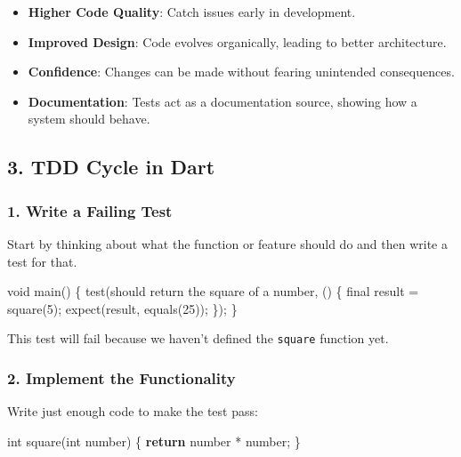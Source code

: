 \documentclass[
]{article}
\newenvironment{Shaded}{\begin{snugshade}}{\end{snugshade}}
\newcommand{\AttributeTok}[1]{\textcolor[rgb]{0.16,0.50,0.73}{#1}}
\newcommand{\DataTypeTok}[1]{\textcolor[rgb]{0.16,0.50,0.73}{#1}}
\newcommand{\DecValTok}[1]{\textcolor[rgb]{0.96,0.45,0.00}{#1}}
\newcommand{\KeywordTok}[1]{\textcolor[rgb]{0.81,0.81,0.76}{\textbf{#1}}}
\newcommand{\NormalTok}[1]{\textcolor[rgb]{0.81,0.81,0.76}{#1}}
\newcommand{\OperatorTok}[1]{\textcolor[rgb]{0.81,0.81,0.76}{#1}}
\newcommand{\StringTok}[1]{\textcolor[rgb]{0.96,0.31,0.31}{#1}}
\providecommand{\tightlist}{%
  \setlength{\itemsep}{0pt}\setlength{\parskip}{0pt}}
\begin{document}
\begin{itemize}
\tightlist
\item
  \textbf{Higher Code Quality}: Catch issues early in development.
\item
  \textbf{Improved Design}: Code evolves organically, leading to better
  architecture.
\item
  \textbf{Confidence}: Changes can be made without fearing unintended
  consequences.
\item
  \textbf{Documentation}: Tests act as a documentation source, showing
  how a system should behave.
\end{itemize}

\subsection{3. TDD Cycle in Dart}\label{tdd-cycle-in-dart}

\subsubsection{1. Write a Failing Test}\label{write-a-failing-test}

Start by thinking about what the function or feature should do and then
write a test for that.

\begin{Shaded}
\begin{Highlighting}[]
\DataTypeTok{void}\NormalTok{ main() }\OperatorTok{\{}
\NormalTok{  test(}\StringTok{\textquotesingle{}should return the square of a number\textquotesingle{}}\OperatorTok{,}\NormalTok{ () }\OperatorTok{\{}
    \AttributeTok{final}\NormalTok{ result }\OperatorTok{=}\NormalTok{ square(}\DecValTok{5}\NormalTok{);}
\NormalTok{    expect(result}\OperatorTok{,}\NormalTok{ equals(}\DecValTok{25}\NormalTok{));}
  \OperatorTok{\}}\NormalTok{);}
\OperatorTok{\}}
\end{Highlighting}
\end{Shaded}

This test will fail because we haven't defined the \texttt{square}
function yet.

\subsubsection{2. Implement the
Functionality}\label{implement-the-functionality}

Write just enough code to make the test pass:

\begin{Shaded}
\begin{Highlighting}[]
\DataTypeTok{int}\NormalTok{ square(}\DataTypeTok{int}\NormalTok{ number) }\OperatorTok{\{}
  \KeywordTok{return}\NormalTok{ number }\OperatorTok{*}\NormalTok{ number;}
\OperatorTok{\}}
\end{Highlighting}
\end{Shaded}
\end{document}
